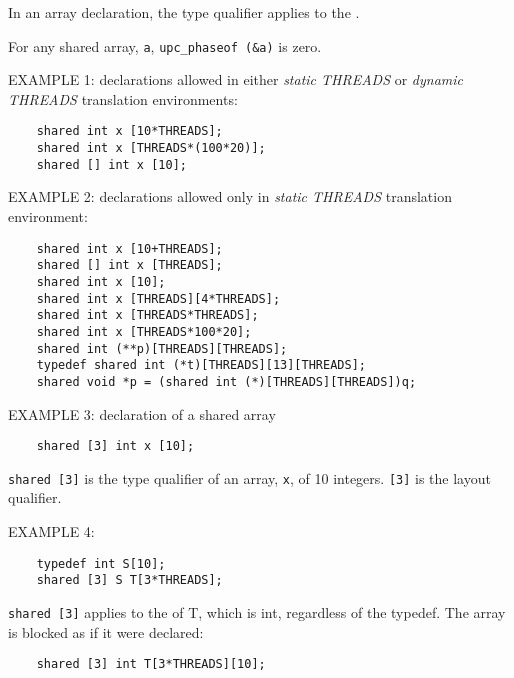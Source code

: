 \np In an array declaration, the type qualifier applies to
    the .

\np For any shared array, {\tt a}, {\tt upc\_phaseof (\&a)} is
    zero.

\np EXAMPLE 1: declarations allowed in either {\em static THREADS} or
    {\em dynamic THREADS} translation environments:

\cbstart
\begin{verbatim}
    shared int x [10*THREADS];  
    shared int x [THREADS*(100*20)];  
    shared [] int x [10]; 
\end{verbatim}
\cbend

\np EXAMPLE 2: declarations allowed only in {\em static THREADS} translation
    environment:

\cbstart
\begin{verbatim}
    shared int x [10+THREADS];  
    shared [] int x [THREADS];  
    shared int x [10]; 
    shared int x [THREADS][4*THREADS];
    shared int x [THREADS*THREADS];
    shared int x [THREADS*100*20];
    shared int (**p)[THREADS][THREADS];
    typedef shared int (*t)[THREADS][13][THREADS];
    shared void *p = (shared int (*)[THREADS][THREADS])q;  
\end{verbatim}
\cbend
{}

\np EXAMPLE 3: declaration of a shared array 

\begin{verbatim}
    shared [3] int x [10];
\end{verbatim}

   {\tt shared [3]} is the type qualifier of an array, {\tt x}, of 10
   integers. {\tt [3]} is the layout qualifier.

\np EXAMPLE 4: 

\begin{verbatim}
    typedef int S[10]; 
    shared [3] S T[3*THREADS]; 
\end{verbatim}
   

   {\tt shared [3]} applies to the  of T, which is int,
   regardless of the typedef.  The array is blocked as if it were
   declared:

\begin{verbatim}
    shared [3] int T[3*THREADS][10]; 
\end{verbatim}


